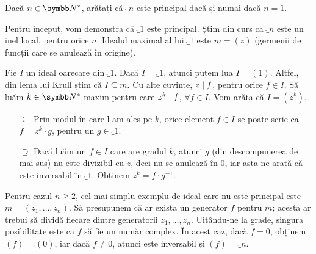 \begin{problem}
Dacă \(n \in \naturals^*\), arătați că \(\ring_n\) este principal dacă și numai dacă \(n = 1\).
\end{problem}
\begin{solution}
Pentru început, vom demonstra că \(\ring_1\) este principal. Știm din curs că \(\ring_n\) este un inel local, pentru orice \(n\). Idealul maximal al lui \(\ring_1\) este \(m = (z)\) (germenii de funcții care se anulează în origine).

Fie \(I\) un ideal oarecare din \(\ring_1\). Dacă \(I = \ring_1\), atunci putem lua \(I = (1)\). Altfel, din lema lui Krull știm că \(I \subseteq m\). Cu alte cuvinte, \(z \mid f\), pentru orice \(f \in I\). Să luăm \(k \in \naturals^*\) maxim pentru care \(z^k \mid f\), \(\forall f \in I\). Vom arăta că \(I = (z^k)\).
\begin{itemize}
    \item[\(\subseteq\)] Prin modul în care l-am ales pe \(k\), orice element \(f \in I\) se poate scrie ca \(f = z^k \cdot g\), pentru un \(g \in \ring_1\).

    \item[\(\supseteq\)] Dacă luăm un \(f \in I\) care are gradul \(k\), atunci \(g\) (din descompunerea de mai sus) nu este divizibil cu \(z\), deci nu se anulează în \(0\), iar asta ne arată că este inversabil în \(\ring_1\). Obținem \(z^k = f \cdot g^{-1}\).
\end{itemize}

Pentru cazul \(n \geq 2\), cel mai simplu exemplu de ideal care nu este principal este \(m = \left(z_1, \dots, z_n\right)\). Să presupunem că ar exista un generator \(f\) pentru \(m\); acesta ar trebui să dividă fiecare dintre generatorii \(z_1, \dots, z_n\). Uitându-ne la grade, singura posibilitate este ca \(f\) să fie un număr complex. În acest caz, dacă \(f = 0\), obținem \(\left(f\right) = (0)\), iar dacă \(f \neq 0\), atunci este inversabil și \(\left(f\right) = \ring_n\).
\end{solution}

